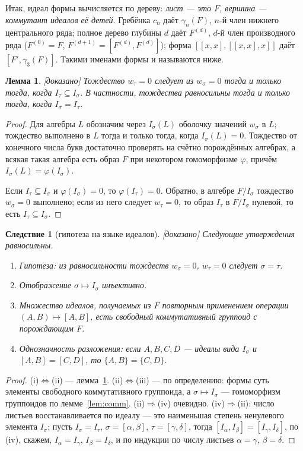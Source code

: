 \documentclass[11pt]{article}
\newcommand{\g}{\gamma}
\newcommand{\stat}[1]{\textsf{\small[#1]}}
\newcommand{\proved}{\stat{доказано}}
\theoremstyle{plain}
\newtheorem{lemma}[theorem]{Лемма}
\newtheorem{corollary}[theorem]{Следствие}
\theoremstyle{definition}
\theoremstyle{remark}
\begin{document}
Итак, идеал формы вычисляется по дереву: \emph{лист --- это $F$, вершина --- коммутант идеалов её детей}. Гребёнка $c_n$ даёт $\g_n(F)$, $n$-й член нижнего центрального ряда; полное дерево глубины $d$ даёт $F^{(d)}$, $d$-й член производного ряда ($F^{(0)}=F$, $F^{(d+1)}=[F^{(d)},F^{(d)}]$); форма $[[x,x],[[x,x],x]]$ даёт $[F',\g_3(F)]$. Такими именами формы и называются ниже.

\begin{lemma}\label{lem:impl} \proved{}
Тождество $w_\tau=0$ следует из $w_\sigma=0$ тогда и только тогда, когда $I_\tau\subseteq I_\sigma$. В частности, тождества равносильны тогда и только тогда, когда $I_\sigma=I_\tau$.
\end{lemma}
\begin{proof}
Для алгебры $L$ обозначим через $I_\sigma(L)$ оболочку значений $w_\sigma$ в $L$; тождество выполнено в $L$ тогда и только тогда, когда $I_\sigma(L)=0$. Тождество от конечного числа букв достаточно проверять на счётно порождённых алгебрах, а всякая такая алгебра есть образ $F$ при некотором гомоморфизме $\varphi$, причём $I_\sigma(L)=\varphi(I_\sigma)$.

Если $I_\tau\subseteq I_\sigma$ и $\varphi(I_\sigma)=0$, то $\varphi(I_\tau)=0$. Обратно, в алгебре $F/I_\sigma$ тождество $w_\sigma=0$ выполнено; если из него следует $w_\tau=0$, то образ $I_\tau$ в $F/I_\sigma$ нулевой, то есть $I_\tau\subseteq I_\sigma$.
\end{proof}

\begin{corollary}[гипотеза на языке идеалов]\label{cor:groupoid} \proved{}
Следующие утверждения равносильны.
\begin{enumerate}[label=(\roman*)]
\item Гипотеза: из равносильности тождеств $w_\sigma=0$, $w_\tau=0$ следует $\sigma=\tau$.
\item Отображение $\sigma\mapsto I_\sigma$ инъективно.
\item Множество идеалов, получаемых из $F$ повторным применением операции $(A,B)\mapsto[A,B]$, есть свободный коммутативный группоид с порождающим $F$.
\item Однозначность разложения: если $A,B,C,D$ --- идеалы вида $I_\sigma$ и $[A,B]=[C,D]$, то $\{A,B\}=\{C,D\}$.
\end{enumerate}
\end{corollary}
\begin{proof}
(i)$\Leftrightarrow$(ii) --- лемма~\ref{lem:impl}. (ii)$\Leftrightarrow$(iii) --- по определению: формы суть элементы свободного коммутативного группоида, а $\sigma\mapsto I_\sigma$ --- гомоморфизм группоидов по лемме~\ref{lem:comm}. (ii)$\Rightarrow$(iv) очевидно. (iv)$\Rightarrow$(ii): число листьев восстанавливается по идеалу --- это наименьшая степень ненулевого элемента $I_\sigma$; пусть $I_\sigma=I_\tau$, $\sigma=[\alpha,\beta]$, $\tau=[\gamma,\delta]$, тогда $[I_\alpha,I_\beta]=[I_\gamma,I_\delta]$, по (iv), скажем, $I_\alpha=I_\gamma$, $I_\beta=I_\delta$, и по индукции по числу листьев $\alpha=\gamma$, $\beta=\delta$.
\end{proof}
\end{document}
